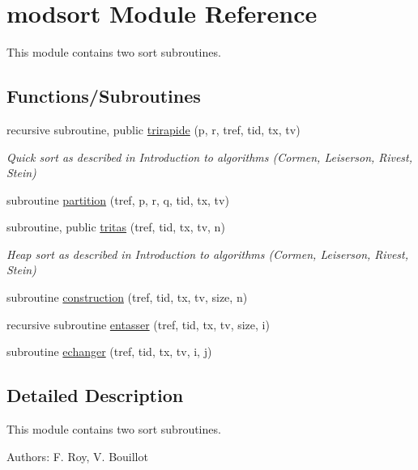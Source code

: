 \hypertarget{namespacemodsort}{}\section{modsort Module Reference}
\label{namespacemodsort}


This module contains two sort subroutines.  


\subsection*{Functions/\+Subroutines}
\begin{DoxyCompactItemize}
\item 
recursive subroutine, public \hyperlink{namespacemodsort_a9c9ed3d1f948bf7023476506e298e0bf}{trirapide} (p, r, tref, tid, tx, tv)
\begin{DoxyCompactList}\small\item\em Quick sort as described in Introduction to algorithms (Cormen, Leiserson, Rivest, Stein) \end{DoxyCompactList}\item 
subroutine \hyperlink{namespacemodsort_a86fab5cf7c126f47a3f7df3d93447784}{partition} (tref, p, r, q, tid, tx, tv)
\item 
subroutine, public \hyperlink{namespacemodsort_a22712b17a572f1af3a89bb0247b6616c}{tritas} (tref, tid, tx, tv, n)
\begin{DoxyCompactList}\small\item\em Heap sort as described in Introduction to algorithms (Cormen, Leiserson, Rivest, Stein) \end{DoxyCompactList}\item 
subroutine \hyperlink{namespacemodsort_abdddab14c10da69038614dfbaf611056}{construction} (tref, tid, tx, tv, size, n)
\item 
recursive subroutine \hyperlink{namespacemodsort_a7cf26a2aded499f04cfddd9a93801356}{entasser} (tref, tid, tx, tv, size, i)
\item 
subroutine \hyperlink{namespacemodsort_aa2757c63708f71eb3b4a4446b4ba6c39}{echanger} (tref, tid, tx, tv, i, j)
\end{DoxyCompactItemize}


\subsection{Detailed Description}
This module contains two sort subroutines. 

Authors\+: F. Roy, V. Bouillot 

